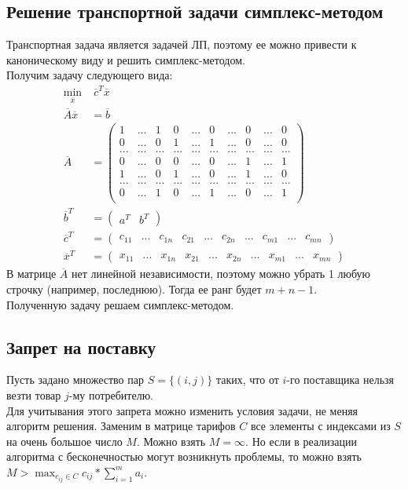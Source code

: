 \subsection{Решение транспортной задачи симплекс-методом}
Транспортная задача является задачей ЛП, поэтому ее можно привести к каноническому виду и решить симплекс-методом. \\
Получим задачу следующего вида:\\
\begin{align*}
	\min_{\overline{x}} &\; \overline{c}^T \overline{x} \\
	\overline{A}\overline{x} &=\overline{b} \\
	\overline{A} &=\begin{pmatrix} 
			1 & ... & 1 & 0 & ... & 0 & ... & 0 & ... & 0 \\
			0 & ... & 0 & 1 & ... & 1 & ... & 0 & ... & 0 \\
			... & ... & ... & ... & ... & ... & ... & ... & ... & ... \\
			0 & ... & 0 & 0 & ... & 0 & ... & 1 & ... & 1 \\ \hline
			1 & ... & 0 & 1 & ... & 0 & ... & 1 & ... & 0 \\
			... & ... & ... & ... & ... & ... & ... & ... & ... & ... \\
			0 & ... & 1 & 0 & ... & 1 & ... & 0 & ... & 1 \\
		\end{pmatrix} \\
	\overline{b}^T &= \begin{pmatrix} a^T & b^T \end{pmatrix} \\
	\overline{c}^T &= \begin{pmatrix} c_{11} & ... & c_{1n} & c_{21} & ... & c_{2n} & ... & c_{m1} & ... & c_{mn} \end{pmatrix} \\
	\overline{x}^T &= \begin{pmatrix} x_{11} & ... & x_{1n} & x_{21} & ... & x_{2n} & ... & x_{m1} & ... & x_{mn} \end{pmatrix}
\end{align*}
В матрице $\overline{A}$ нет линейной независимости, поэтому можно убрать 1 любую строчку (например, последнюю). Тогда ее ранг будет $m+n-1$. \\
Полученную задачу решаем симплекс-методом.

\subsection{Запрет на поставку}
Пусть задано множество пар $S=\{(i,j)\}$ таких, что от $i$-го поставщика нельзя везти товар $j$-му потребителю. \\
Для учитывания этого запрета можно изменить условия задачи, не меняя алгоритм решения. Заменим в матрице тарифов $C$ все элементы с индексами из $S$ на очень большое число $M$. Можно взять $M=\infty$. Но если в реализации алгоритма с бесконечностью могут возникнуть проблемы, то можно взять $M>\max_{c_{ij}\in C} c_{ij} \ast \sum_{i=1}^m a_i$.



